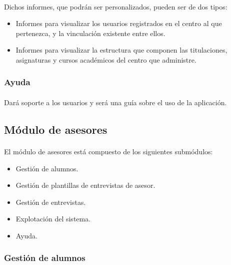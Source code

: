       \paragraph{}Dichos informes, que podrán ser personalizados, pueden ser
      de dos tipos:

      \begin{itemize}
       \item Informes para visualizar los usuarios registrados en el centro
             al que pertenezca, y la vinculación existente entre ellos.
       \item Informes para visualizar la estructura que componen las
             titulaciones, asignaturas y cursos académicos del centro que
             administre.
      \end{itemize}

      \subsubsection{Ayuda}

      \paragraph{}Dará soporte a los usuarios y será una guía sobre el uso de
      la aplicación.

   \subsection{Módulo de asesores}

      \paragraph{}El módulo de asesores está compuesto de los siguientes
      submódulos:

      \begin{itemize}
       \item Gestión de alumnos.
       \item Gestión de plantillas de entrevistas de asesor.
       \item Gestión de entrevistas.
       \item Explotación del sistema.
       \item Ayuda.
      \end{itemize}

      \subsubsection{Gestión de alumnos}

